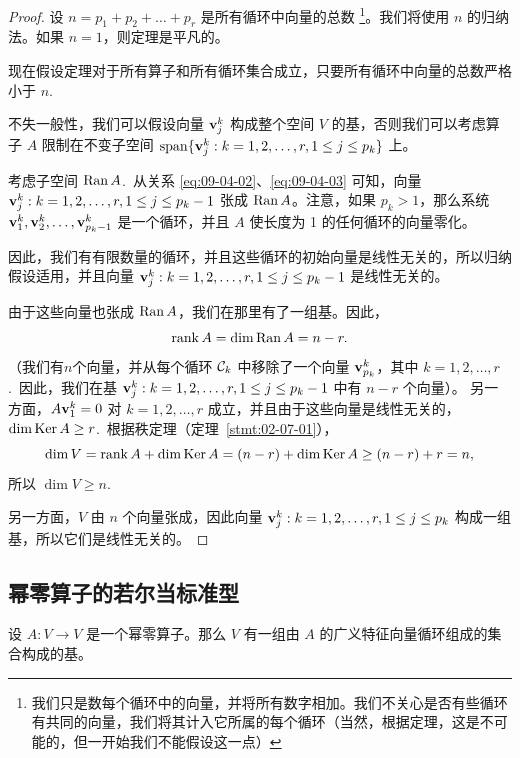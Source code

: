 \begin{proof}设 $n = p_1 + p_2 + \dots + p_r$ 是所有循环中向量的总数
\footnote{
我们只是数每个循环中的向量，并将所有数字相加。我们不关心是否有些循环有共同的向量，我们将其计入它所属的每个循环（当然，根据定理，这是不可能的，但一开始我们不能假设这一点）
}。我们将使用 $n$ 的归纳法。如果 $n=1$，则定理是平凡的。

现在假设定理对于所有算子和所有循环集合成立，只要所有循环中向量的总数严格小于 $n$.~

不失一般性，我们可以假设向量 $\mathbf{v}^{k}_{j}$ 构成整个空间 $V$ 的基，否则我们可以考虑算子 $A$ 限制在不变子空间 $\operatorname{span}\{\mathbf{v}^{k}_{j} : k = 1, 2, \dots, r, 1 \leq j \leq p_k\}$ 上。

考虑子空间 $\operatorname{Ran} A$.~从关系 \eqref{eq:09-04-02}、\eqref{eq:09-04-03} 可知，向量 $\mathbf{v}^{k}_{j} : k = 1, 2, \dots, r, 1 \leq j \leq p_k - 1$ 张成 $\operatorname{Ran} A$。注意，如果 $p_k > 1$，那么系统 $\mathbf{v}^{k}_{1}, \mathbf{v}^{k}_{2}, \dots, \mathbf{v}^{k}_{p_k-1}$ 是一个循环，并且 $A$ 使长度为 1 的任何循环的向量零化。

因此，我们有有限数量的循环，并且这些循环的初始向量是线性无关的，所以归纳假设适用，并且向量 $\mathbf{v}^{k}_{j} : k = 1, 2, \dots, r, 1 \leq j \leq p_k - 1$ 是线性无关的。

由于这些向量也张成 $\operatorname{Ran} A$，我们在那里有了一组基。因此，$$\operatorname{rank} A = \dim \operatorname{Ran} A = n - r.$$
（我们有$n$个向量，并从每个循环 $\mathcal{C}_k$ 中移除了一个向量 $\mathbf{v}_{p_k}^k$，其中 $k = 1, 2, \dots, r$.~因此，我们在基 $\mathbf{v}_j^k : k = 1, 2, \dots, r, 1 \le j \le p_k - 1$ 中有 $n-r$ 个向量）。
另一方面，$A \mathbf{v}^{k}_{1} = 0$ 对 $k = 1, 2, \dots, r$ 成立，并且由于这些向量是线性无关的，$\dim \operatorname{Ker} A \geq r$.~根据秩定理（定理~\ref{stmt:02-07-01}），
$$\dim V = \operatorname{rank} A + \dim \operatorname{Ker} A = (n - r) + \dim \operatorname{Ker} A \geq (n - r) + r = n,$$
所以 $\dim V \geq n$.~

另一方面，$V$ 由 $n$ 个向量张成，因此向量 $\mathbf{v}^{k}_{j} : k = 1, 2, \dots, r, 1 \leq j \leq p_k$ 构成一组基，所以它们是线性无关的。\end{proof}


\subsection{幂零算子的若尔当标准型}\label{sec:09-04-02}

\begin{theorem}\label{stmt:09-04-02}
设 $A: V \to V$ 是一个幂零算子。那么 $V$ 有一组由 $A$ 的广义特征向量循环组成的集合构成的基。\end{theorem}

